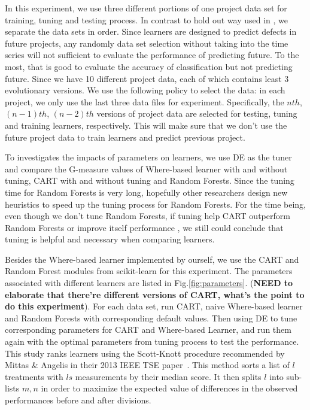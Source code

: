 \documentclass{sig-alternative}
\begin{document}
In this experiment, we use three different portions of one project data set for training, tuning 
and testing process. In contrast to hold out way used in \cite{lessmann2008benchmarking, 
menzies2007data}, we separate the data sets in order. Since learners are designed to predict 
defects in future projects,  any randomly data set selection without taking into the time series 
will not sufficient to evaluate the performance of predicting future. To the most, that is good to 
evaluate the accuracy of classification but not predicting future. Since we have 10 different 
project data, each of which contains least 3 evolutionary versions. We use the following policy 
to select the data: in each project, we only use the last three data files for experiment. 
Specifically, the $nth$,  $(n-1)th$, $(n-2)th$ versions of project data are selected for testing, 
tuning and training learners, respectively. This will make sure that we don't use the future 
project data to train learners and predict previous project.

To investigates the impacts of parameters on learners, we use DE as the tuner and compare the G-measure 
values of Where-based learner with and without tuning, CART with and without tuning and Random 
Forests. Since the tuning time for Random Forests is very long, hopefully other researchers design
new heuristics to speed up the tuning process for Random Forests.  For the time being, even though
we don't tune Random Forests, if tuning help CART outperform Random Forests or improve itself performance ,
we still could conclude that tuning is helpful and necessary when comparing learners.

Besides the Where-based learner implemented by ourself,  we use the CART and Random Forest modules 
from scikit-learn \cite{scikit-learn} for this experiment. The parameters associated with different learners are listed in Fig.\ref{fig:parameters}. (\textbf{NEED to elaborate that there're different versions of CART, what's the point to do this experiment}). For each data set, run CART, naive Where-based learner and Random Forests with corresponding default values. Then using DE to tune corresponding parameters for CART and Where-based Learner,  and run them again with the optimal parameters from tuning process to test the performance. 
This study ranks learners using the Scott-Knott procedure recommended by Mittas \& Angelis in their 2013
IEEE TSE paper~\cite{mittas2013ranking}.  This method sorts a list of $l$ treatments with $ls$ measurements by their median score. It then splits $l$ into sub-lists $m,n$ in order to maximize the expected value of differences  in the observed performances before and after divisions. 
\end{document}
